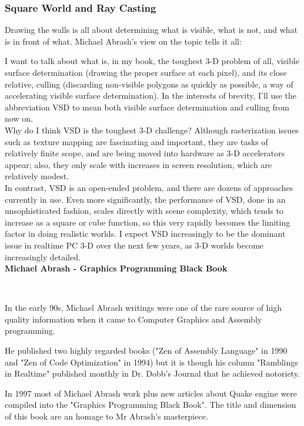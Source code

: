 \subsubsection{Square World and Ray Casting}
Drawing the walls is all about determining what is visible, what is not, and what is in front of what. Michael Abrash's view on the topic tells it all:\\
\par
\begin{fancyquotes}
I want to talk about what is, in my book, the toughest 3-D problem of all, visible surface determination (drawing the proper surface at each pixel), and its close relative, culling (discarding non-visible polygons as quickly as possible, a way of accelerating visible surface determination). In the interests of brevity, I'll use the abbreviation VSD to mean both visible surface determination and culling from now on.
 \bigskip \\
Why do I think VSD is the toughest 3-D challenge? Although rasterization issues such as texture mapping are fascinating and important, they are tasks of relatively finite scope, and are being moved into hardware as 3-D accelerators appear; also, they only scale with increases in screen resolution, which are relatively modest.
 \bigskip \\
In contrast, VSD is an open-ended problem, and there are dozens of approaches currently in use. Even more significantly, the performance of VSD, done in an unsophisticated fashion, scales directly with scene complexity, which tends to increase as a square or cube function, so this very rapidly becomes the limiting factor in doing realistic worlds. I expect VSD increasingly to be the dominant issue in realtime PC 3-D over the next few years, as 3-D worlds become increasingly detailed.
 \bigskip \\
\textbf{Michael Abrash - Graphics Programming Black Book}
 \end{fancyquotes}\\
\par
\begin{figure} 
\vspace{-10pt}
\end{figure} 
 In the early 90s, Michael Abrash writings were one of the rare source of high quality information when it came to Computer Graphics and Assembly programming.\\
\par
He published two highly regarded books ("Zen of Assembly Language" in 1990 and "Zen of Code Optimization" in 1994) but it is though his column "Ramblings in Realtime" published monthly in Dr. Dobb's Journal that he achieved notoriety.
 \\
\par
 In 1997 most of Michael Abrash work plus new articles about Quake engine were compiled into the "Graphics Programming Black Book". The title and dimension of this book are an homage to Mr Abrash's masterpiece.





